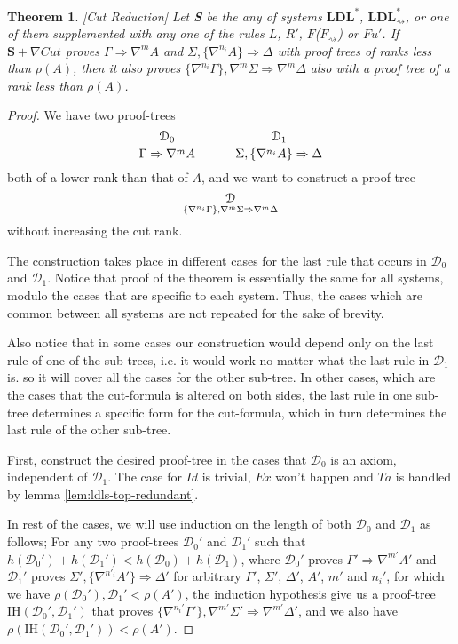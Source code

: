 \documentclass[12pt,a4paper]{article}
\theoremstyle{plain}
\newtheorem{thm}{Theorem}[section]
\theoremstyle{definition}
\begin{document}
\begin{thm}\label{thm:ldls-cut-reduction}[Cut Reduction]
Let \textbf{S} be the any of systems $\mathbf{LDL}^{*}$, $\mathbf{LDL}^{*}_{\rightsquigarrow}$, or one of them supplemented with any one of the rules $L$, $R'$, $F$($F_\rightsquigarrow$) or $Fu'$. If $\mathbf{S} + \nabla Cut$ proves $\Gamma \Rightarrow \nabla^m A$ and $\Sigma , \{\nabla^{n_i} A\} \Rightarrow \Delta$ with proof trees of ranks less than $\rho(A)$, then it also proves $\{\nabla^{n_i} \Gamma\} , \nabla^m\Sigma \Rightarrow \nabla^m\Delta$ also with a proof tree of a rank less than $\rho(A)$.
\end{thm}
\begin{proof}
	We have two proof-trees
  \[
    {\mathcal{D}_0
    \atop
    \Gamma \Rightarrow \nabla^m A}
    \hspace{3em}
    {\mathcal{D}_1
    \atop
    \Sigma , \{\nabla^{n_i} A\} \Rightarrow \Delta}
  \]
  both of a lower rank than that of $A$, and we want to construct a proof-tree
  \[\mathcal{D} \atop \{\nabla^{n_i} \Gamma\} , \nabla^m \Sigma \Rightarrow \nabla^m \Delta \]
  without increasing the cut rank.

	The construction takes place in different cases for the last rule that occurs in $\mathcal{D}_0$ and $\mathcal{D}_1$. Notice that proof of the theorem is essentially the same for all systems, modulo the cases that are specific to each system. Thus, the cases which are common between all systems are not repeated for the sake of brevity.

	Also notice that in some cases our construction would depend only on the last rule of one of the sub-trees, i.e. it would work no matter what the last rule in $\mathcal{D}_1$ is. so it will cover all the cases for the other sub-tree. In other cases, which are the cases that the cut-formula is altered on both sides, the last rule in one sub-tree determines a specific form for the cut-formula, which in turn determines the last rule of the other sub-tree.


	First, construct the desired proof-tree in the cases that $\mathcal{D}_0$ is an axiom, independent of $\mathcal{D}_1$. The case for $Id$ is trivial, $Ex$ won't happen and $Ta$ is handled by lemma \ref{lem:ldls-top-redundant}.

  In rest of the cases, we will use induction on the length of both $\mathcal{D}_0$ and $\mathcal{D}_1$ as follows; For any two proof-trees $\mathcal{D}_0'$ and $\mathcal{D}_1'$ such that $h(\mathcal{D}_0') + h(\mathcal{D}_1') < h(\mathcal{D}_0) + h(\mathcal{D}_1)$, where $\mathcal{D}_0'$ proves $\Gamma' \Rightarrow \nabla^{m'} A'$ and $\mathcal{D}_1'$ proves $\Sigma', \{\nabla^{n'_i} A'\} \Rightarrow \Delta'$ for arbitrary $\Gamma'$, $\Sigma'$, $\Delta'$, $A'$, $m'$ and $n_i'$, for which we have $\rho(\mathcal{D}_0'),\mathcal{D}_1' < \rho(A')$, the induction hypothesis give us a proof-tree $\text{IH}(\mathcal{D}_0', \mathcal{D}_1')$ that proves $\{\nabla^{n_i'}\Gamma'\}, \nabla^{m'} \Sigma' \Rightarrow \nabla^{m'} \Delta'$, and we also have $\rho(\text{IH}(\mathcal{D}_0', \mathcal{D}_1')) < \rho(A')$.



\end{proof}
\end{document}
